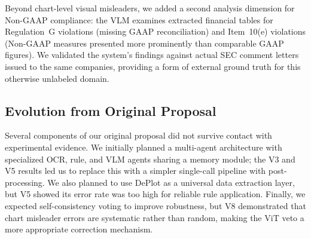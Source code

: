 Beyond chart-level visual misleaders, we added a second analysis dimension for Non-GAAP compliance: the VLM examines extracted financial tables for Regulation~G violations (missing GAAP reconciliation) and Item~10(e) violations (Non-GAAP measures presented more prominently than comparable GAAP figures). We validated the system's findings against actual SEC comment letters issued to the same companies, providing a form of external ground truth for this otherwise unlabeled domain.

\subsection{Evolution from Original Proposal}
\label{sec:pivots}

Several components of our original proposal did not survive contact with experimental evidence. We initially planned a multi-agent architecture with specialized OCR, rule, and VLM agents sharing a memory module; the V3 and V5 results led us to replace this with a simpler single-call pipeline with post-processing. We also planned to use DePlot as a universal data extraction layer, but V5 showed its error rate was too high for reliable rule application. Finally, we expected self-consistency voting to improve robustness, but V8 demonstrated that chart misleader errors are systematic rather than random, making the ViT veto a more appropriate correction mechanism.
